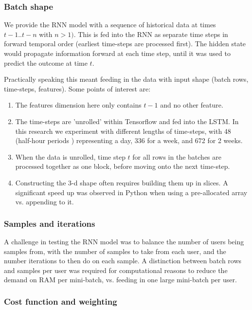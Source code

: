 \subsubsection{Batch shape}

We provide the RNN model with a sequence of historical data at times $t-1 .. t-n$ with $n >1)$. This is fed into the RNN as separate time steps in forward temporal order (earliest time-steps are processed first). The hidden state would propagate information forward at each time step, until it was used to predict the outcome at time $t$.

Practically speaking this meant feeding in the data with input shape (batch rows, time-steps, features). Some points of interest are:

\begin{enumerate}
	\item The features dimension here only contains $t-1$ and no other feature. 
		
	\item The time-steps are 'unrolled' within Tensorflow and fed into the LSTM. In this research we experiment with different lengths of time-steps, with 48 (half-hour periods ) representing a day, 336 for a week, and 672 for 2 weeks.

	\item When the data is unrolled, time step $t$ for all rows in the batches are processed together as one block, before moving onto the next time-step.

	\item Constructing the 3-d shape often requires building them up in slices. A significant speed up was observed in Python when using a pre-allocated array vs. appending to it.
\end{enumerate}

\subsubsection{Samples and iterations}

A challenge in testing the RNN model was to balance the number of users being samples from, with the number of samples to take from each user, and the number iterations to then do on each sample. A distinction between batch rows and samples per user was required for computational reasons to reduce the demand on RAM per mini-batch, vs. feeding in one large mini-batch per user.

\subsubsection{Cost function and weighting}

